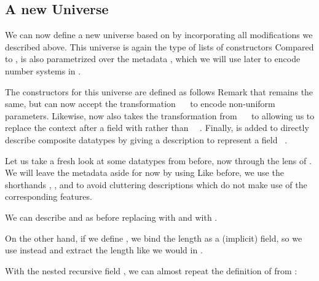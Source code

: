 \subsection{A new Universe}\label{ssec:desc}
We can now define a new universe based on  by incorporating all modifications we described above. This universe is again the type of lists of constructors
Compared to ,  is also parametrized over the metadata , which we will use later to encode number systems in .

The constructors for this universe are defined as follows
Remark that  remains the same, but  can now accept the transformation \ \  to encode non-uniform parameters. Likewise,  now also takes the transformation  from \ \  to  allowing us to replace the context after a field with  rather than \ \ . Finally,  is added to directly describe composite datatypes by giving a description  to represent a field \ .

Let us take a fresh look at some datatypes from before, now through the lens of . We will leave the metadata aside for now by using
Like before, we use the shorthands , , and  to avoid cluttering descriptions which do not make use of the corresponding features. 

We can describe \bN{} and  as before
replacing  with  and  with .

On the other hand, if we define , we bind the length as a (implicit) field, so we use  instead
and extract the length  like we would in .

With the nested recursive field , we can almost repeat the definition of  from :

